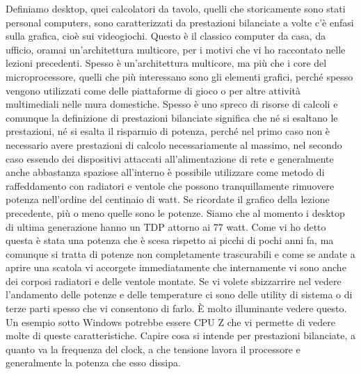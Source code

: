 Definiamo desktop, quei calcolatori da tavolo, quelli che storicamente sono stati personal computers, sono caratterizzati da prestazioni bilanciate a volte c'è enfasi sulla grafica, cioè sui videogiochi.
Questo è il classico computer da casa, da ufficio, oramai un'architettura multicore, per i motivi che vi ho raccontato nelle lezioni precedenti.
Spesso è un'architettura multicore, ma più che i core del microprocessore, quelli che più interessano sono gli elementi grafici, perché spesso vengono utilizzati come delle piattaforme di gioco o per altre attività multimediali nelle mura domestiche.
Spesso è uno spreco di risorse di calcoli e comunque la definizione di prestazioni bilanciate significa che né si esaltano le prestazioni, né si esalta il risparmio di potenza, perché nel primo caso non è necessario avere prestazioni di calcolo necessariamente al massimo, nel secondo caso essendo dei dispositivi attaccati all'alimentazione di rete e generalmente anche abbastanza spaziose all'interno è possibile utilizzare come metodo di raffeddamento con radiatori e ventole che possono tranquillamente rimuovere potenza nell'ordine del centinaio di watt.
Se ricordate il grafico della lezione precedente, più o meno quelle sono le potenze.
Siamo che al momento i desktop di ultima generazione hanno un TDP attorno ai 77 watt.
Come vi ho detto questa è stata una potenza che è scesa rispetto ai picchi di pochi anni fa, ma comunque si tratta di potenze non completamente trascurabili e come se andate a aprire una scatola vi accorgete immediatamente che internamente vi sono anche dei corposi radiatori e delle ventole montate.
Se vi volete sbizzarrire nel vedere l'andamento delle potenze e delle temperature ci sono delle utility di sistema o di terze parti spesso che vi consentono di farlo.
È molto illuminante vedere questo.
Un esempio sotto Windows potrebbe essere CPU Z che vi permette di vedere molte di queste caratteristiche.
Capire cosa si intende per prestazioni bilanciate, a quanto va la frequenza del clock, a che tensione lavora il processore e generalmente la potenza che esso dissipa.

